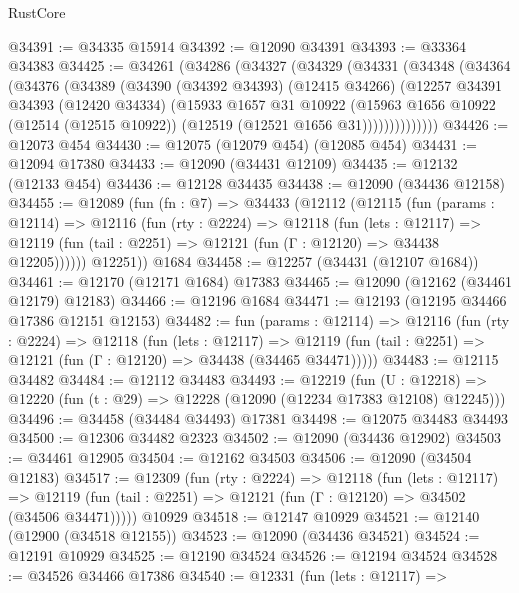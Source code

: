 \begin{lexlean}{RustCore}
\begin{coremodule}
@34391 := @34335 @15914
@34392 := @12090 @34391
@34393 := @33364 @34383
@34425 := @34261
    (@34286
      (@34327
        (@34329
          (@34331
            (@34348
              (@34364
                (@34376
                  (@34389
                    (@34390
                      (@34392 @34393)
                      (@12415 @34266)
                      (@12257
                        @34391
                        @34393
                        (@12420 @34334)
                        (@15933
                          @1657
                          @31
                          @10922
                          (@15963
                            @1656
                            @10922
                            (@12514 (@12515 @10922))
                            (@12519 (@12521 @1656 @31))))))))))))))
@34426 := @12073 @454
@34430 := @12075 (@12079 @454) (@12085 @454)
@34431 := @12094 @17380
@34433 := @12090 (@34431 @12109)
@34435 := @12132 (@12133 @454)
@34436 := @12128 @34435
@34438 := @12090 (@34436 @12158)
@34455 := @12089
    (fun (fn : @7) =>
    @34433
      (@12112
        (@12115
          (fun (params : @12114) =>
          @12116
            (fun (rty : @2224) =>
            @12118
              (fun (lets : @12117) =>
              @12119 (fun (tail : @2251) => @12121 (fun (Γ : @12120) => @34438 @12205))))))
        @12251))
    @1684
@34458 := @12257 (@34431 (@12107 @1684))
@34461 := @12170 (@12171 @1684) @17383
@34465 := @12090 (@12162 (@34461 @12179) @12183)
@34466 := @12196 @1684
@34471 := @12193 (@12195 @34466 @17386 @12151 @12153)
@34482 := fun (params : @12114) =>
  @12116
    (fun (rty : @2224) =>
    @12118
      (fun (lets : @12117) =>
      @12119 (fun (tail : @2251) => @12121 (fun (Γ : @12120) => @34438 (@34465 @34471)))))
@34483 := @12115 @34482
@34484 := @12112 @34483
@34493 := @12219
    (fun (U : @12218) => @12220 (fun (t : @29) => @12228 (@12090 (@12234 @17383 @12108) @12245)))
@34496 := @34458 (@34484 @34493) @17381
@34498 := @12075 @34483 @34493
@34500 := @12306 @34482 @2323
@34502 := @12090 (@34436 @12902)
@34503 := @34461 @12905
@34504 := @12162 @34503
@34506 := @12090 (@34504 @12183)
@34517 := @12309
    (fun (rty : @2224) =>
    @12118
      (fun (lets : @12117) =>
      @12119 (fun (tail : @2251) => @12121 (fun (Γ : @12120) => @34502 (@34506 @34471)))))
    @10929
@34518 := @12147 @10929
@34521 := @12140 (@12900 (@34518 @12155))
@34523 := @12090 (@34436 @34521)
@34524 := @12191 @10929
@34525 := @12190 @34524
@34526 := @12194 @34524
@34528 := @34526 @34466 @17386
@34540 := @12331
    (fun (lets : @12117) =>

\end{coremodule}
\end{lexlean}
